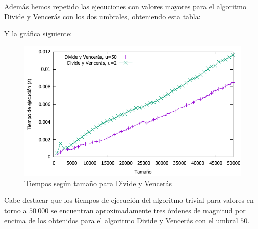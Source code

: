 Además hemos repetido las ejecuciones con valores mayores para el algoritmo Divide y Vencerás con los dos umbrales, obteniendo esta tabla:

\vspace*{1cm}

\prefDVu
{}\prefDVs
{} {\prefDVu}

\pgfplotstabletypeset[
display columns/0/.style={column name=Tamaño},
display columns/1/.style={column name=Mergesort $50$},
display columns/2/.style={column name=Mergesort $2$},
skip rows between index={25}{50}
]{\prefDVu}
\pgfplotstabletypeset[
display columns/0/.style={column name=Tamaño},
display columns/1/.style={column name=Mergesort $50$},
display columns/2/.style={column name=Mergesort $2$},
skip rows between index={0}{25}
]{\prefDVu}

\vspace*{1cm}

Y la gráfica siguiente:

\begin{figure}[H]\includegraphics[width=14cm]{img/comparativa_preferencias_grande.pdf} \centering
	\caption{Tiempos según tamaño para Divide y Vencerás}
\end{figure}

Cabe destacar que los tiempos de ejecución del algoritmo trivial para valores en torno a $50\ 000$ se encuentran aproximadamente tres órdenes de magnitud por encima de los obtenidos para el algoritmo Divide y Vencerás con el umbral $50$.
